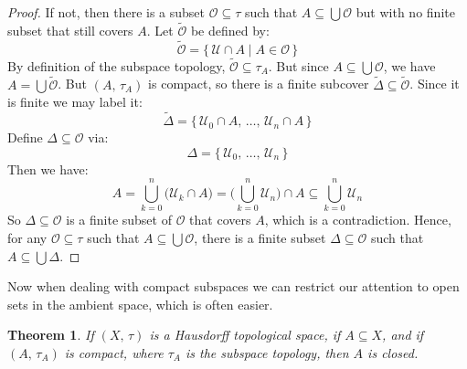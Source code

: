 \documentclass{article}
\theoremstyle{plain}
\newtheorem{theorem}{Theorem}[section]
\theoremstyle{normal}
\begin{document}
        \begin{proof}
            If not, then there is a subset $\mathcal{O}\subseteq\tau$ such
            that $A\subseteq\bigcup\mathcal{O}$ but with no finite subset that
            still covers $A$. Let $\tilde{\mathcal{O}}$ be defined by:
            \begin{equation}
                \tilde{\mathcal{O}}
                =\{\,\mathcal{U}\cap{A}\;|\;A\in\mathcal{O}\,\}
            \end{equation}
            By definition of the subspace topology,
            $\tilde{\mathcal{O}}\subseteq\tau_{A}$. But
            since $A\subseteq\bigcup\mathcal{O}$, we have
            $A=\bigcup\tilde{\mathcal{O}}$. But $(A,\,\tau_{A})$ is compact,
            so there is a finite subcover
            $\tilde{\Delta}\subseteq\tilde{\mathcal{O}}$. Since it is finite we
            may label it:
            \begin{equation}
                \tilde{\Delta}=
                \{\,\mathcal{U}_{0}\cap{A},\,\dots,\,\mathcal{U}_{n}\cap{A}\,\}
            \end{equation}
            Define $\Delta\subseteq\mathcal{O}$ via:
            \begin{equation}
                \Delta=
                \{\,\mathcal{U}_{0},\,\dots,\,\mathcal{U}_{n}\,\}
            \end{equation}
            Then we have:
            \begin{equation}
                A=\bigcup_{k=0}^{n}\big(\mathcal{U}_{k}\cap{A}\big)
                =\Big(\bigcup_{k=0}^{n}\mathcal{U}_{n}\Big)\cap{A}
                \subseteq\bigcup_{k=0}^{n}\mathcal{U}_{n}
            \end{equation}
            So $\Delta\subseteq\mathcal{O}$ is a finite subset of $\mathcal{O}$
            that covers $A$, which is a contradiction. Hence, for any
            $\mathcal{O}\subseteq\tau$ such that $A\subseteq\bigcup\mathcal{O}$,
            there is a finite subset $\Delta\subseteq\mathcal{O}$ such that
            $A\subseteq\bigcup\Delta$.
        \end{proof}
        Now when dealing with compact subspaces we can restrict our attention
        to open sets in the ambient space, which is often easier.
        \begin{theorem}
            If $(X,\,\tau)$ is a Hausdorff topological space, if
            $A\subseteq{X}$, and if $(A,\,\tau_{A})$ is compact, where
            $\tau_{A}$ is the subspace topology, then $A$ is closed. 
        \end{theorem}
\end{document}
